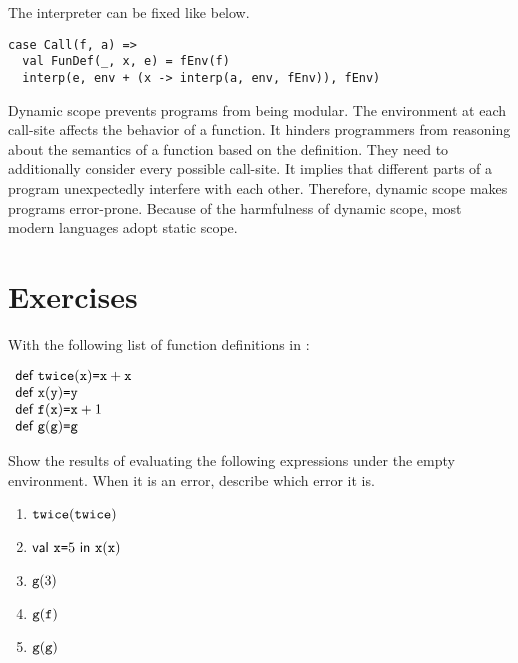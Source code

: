 The interpreter can be fixed like below.

\begin{verbatim}
case Call(f, a) =>
  val FunDef(_, x, e) = fEnv(f)
  interp(e, env + (x -> interp(a, env, fEnv)), fEnv)
\end{verbatim}

Dynamic scope prevents programs from being modular. The environment at each call-site
affects the behavior of a function. It hinders programmers from reasoning about
the semantics of a function based on the definition. They need to additionally consider
every possible call-site. It implies that different parts of a program unexpectedly
interfere with each other. Therefore, dynamic scope makes programs error-prone.
Because of the harmfulness of dynamic scope, most modern languages adopt static
scope.

\section{Exercises}

\begin{exercise}

With the following list of function definitions in \Lang:

$
\begin{array}{l}
  \textsf{def}\ \texttt{twice}(\texttt{x})\texttt{=}\texttt{x}+\texttt{x} \\
  \textsf{def}\ \texttt{x}(\texttt{y})\texttt{=}\texttt{y} \\
  \textsf{def}\ \texttt{f}(\texttt{x})\texttt{=}\texttt{x}+1 \\
  \textsf{def}\ \texttt{g}(\texttt{g})\texttt{=}\texttt{g} \\
\end{array}
$

Show the results of evaluating the following expressions under the empty environment.
When it is an error, describe which error it is.
\begin{enumerate}
  \item $\texttt{twice}(\texttt{twice})$
  \item $\textsf{val}\ \texttt{x}\texttt{=}5\ \textsf{in}\ \texttt{x}(\texttt{x})$
  \item $\texttt{g}(3)$
  \item $\texttt{g}(\texttt{f})$
  \item $\texttt{g}(\texttt{g})$
\end{enumerate}

\end{exercise}
